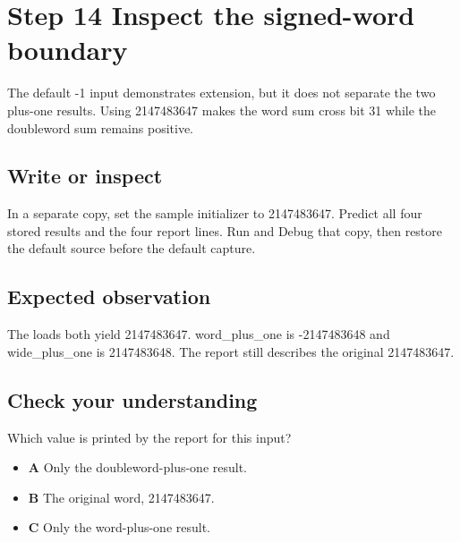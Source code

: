 \section{Step 14 Inspect the signed-word
  boundary}\label{004-bit-inspector-s14-step-14-inspect-the-signed-word-boundary}

The default -1 input demonstrates extension, but it does not separate
the two plus-one results. Using 2147483647 makes the word sum cross bit
31 while the doubleword sum remains positive.

\subsection{Write or
  inspect}\label{004-bit-inspector-s14-write-or-inspect}

In a separate copy, set the sample initializer to 2147483647. Predict
all four stored results and the four report lines. Run and Debug that
copy, then restore the default source before the default capture.

\subsection{Expected
  observation}\label{004-bit-inspector-s14-expected-observation}

The loads both yield 2147483647. word\_plus\_one is -2147483648 and
wide\_plus\_one is 2147483648. The report still describes the original
2147483647.

\subsection{Check your
  understanding}\label{004-bit-inspector-s14-check-your-understanding}

Which value is printed by the report for this input?

\begin{itemize}
  \tightlist
  \item
        \textbf{A} Only the doubleword-plus-one result.
  \item
        \textbf{B} The original word, 2147483647.
  \item
        \textbf{C} Only the word-plus-one result.
\end{itemize}
